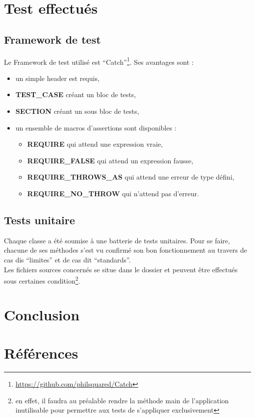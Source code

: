 \documentclass[a4paper,11pt]{report}
\begin{document}
\chapter{Test effectués}
\section{Framework de test}
Le Framework de test utilisé est
``Catch''\footnote{\url{https://github.com/philsquared/Catch}}. Ses avantages
sont :
\begin{itemize}
	\item un simple header est requis,
	\item \textbf{TEST\_CASE} créant un bloc de tests,
	\item \textbf{SECTION} créant un sous bloc de tests,
	\item un ensemble de macros d'assertions sont disponibles :
		\begin{itemize}
			\item\textbf{REQUIRE} qui attend une expression vraie,
			\item\textbf{REQUIRE\_FALSE} qui attend un expression fausse,
			\item\textbf{REQUIRE\_THROWS\_AS} qui attend une erreur de type défini,
			\item\textbf{REQUIRE\_NO\_THROW} qui n'attend pas d'erreur.
		\end{itemize}
\end{itemize} 
\section{Tests unitaire}
Chaque classe a été soumise à une batterie de tests unitaires. Pour se faire,
chacune de ses méthodes s'est vu confirmé son bon fonctionnement au travers de
cas dis ``limites'' et de cas dit ``standards''. \\

Les fichiers sources concernés se situe dans le dossier
et peuvent être effectués sous certaines condition\footnote{en effet, il faudra au
	préalable rendre la méthode main de l'application inutilisable pour 
permettre aux tests de s'appliquer exclusivement}.
\chapter{Conclusion}


\appendix


\chapter{Références}
\end{document}
